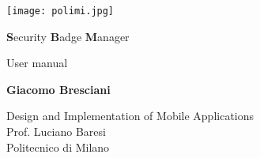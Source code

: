 

\begin{titlepage}
	
    \begin{center}
    
		\texttt{[image: polimi.jpg]}

        \vspace*{3cm}
        
        
        \Huge
        \textbf{S}ecurity \textbf{B}adge \textbf{M}anager
        
        \vspace{0.5cm}
        \LARGE
        User manual
        
        \vspace{1.5cm}
        
        \textbf{Giacomo Bresciani}
        
        \vfill
        
        
        \vspace{0.8cm}
        
        
        \Large
        Design and Implementation of Mobile Applications\\
        Prof. Luciano Baresi\\
        Politecnico di Milano\\

        
        
    \end{center}
\end{titlepage}
